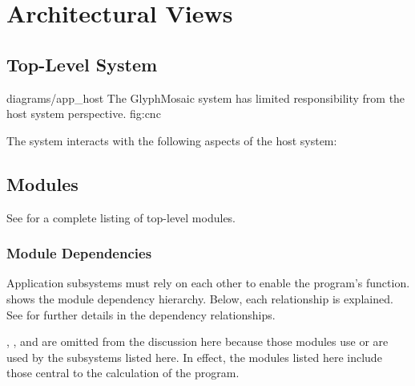 \section{Architectural Views}
\label{sec:views}
\subsection{Top-Level System}
\sidiagram
{diagrams/app_host}
{The GlyphMosaic system has limited responsibility from the host system perspective.}
{fig:cnc}
{\diagsize}

The system interacts with the following aspects of the host system:
\begin{itemize}
\end{itemize}


\subsection{Modules}
\label{sec:modules}
See  for a complete listing of top-level modules.


\subsubsection{Module Dependencies}
Application subsystems must rely on each other to enable the program's function.
 shows the module dependency hierarchy.
Below, each relationship is explained.
See  for further details in the dependency relationships.

\docmod, \uimod, and \bmmod are omitted from the discussion here because those modules use or are used by the subsystems listed here.
In effect, the modules listed here include those central to the calculation of the program.

